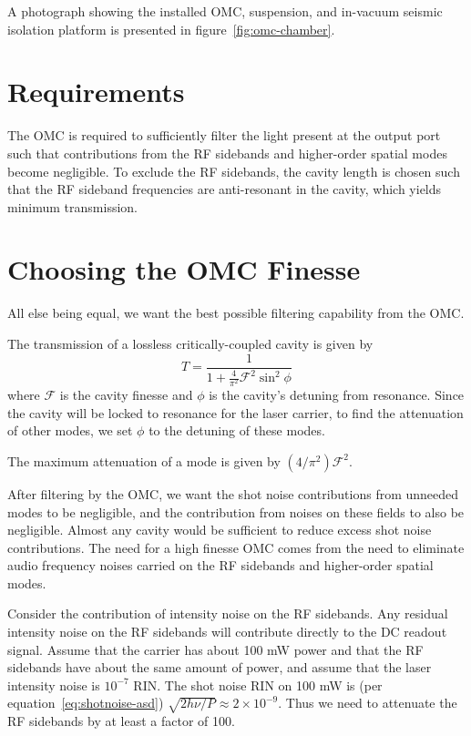 A photograph showing the installed OMC, suspension, and in-vacuum
seismic isolation platform is presented in
figure~\ref{fig:omc-chamber}.

\section{Requirements}

The OMC is required to sufficiently filter the light present at the
output port such that contributions from the RF sidebands and higher-order
spatial modes become negligible. To exclude the RF sidebands, the
cavity length is chosen such that the RF sideband frequencies are
anti-resonant in the cavity, which yields minimum transmission.

\section{Choosing the OMC Finesse}

All else being equal, we want the best possible filtering capability
from the OMC.

The transmission of a lossless critically-coupled cavity is given by
\begin{equation}
T = \frac{1}{1 + \frac{4}{\pi^2}\mathcal{F}^2\sin^2\phi}
\end{equation}
where $\mathcal{F}$ is the cavity finesse and $\phi$ is the cavity's
detuning from resonance.  Since the cavity will be locked to resonance
for the laser carrier, to find the attenuation of other modes, we set
$\phi$ to the detuning of these modes.

The maximum attenuation of a mode is given by $(4/\pi^2)\mathcal{F}^2$.

After filtering by the OMC, we want the shot noise contributions from
unneeded modes to be negligible, and the contribution from noises on
these fields to also be negligible.  Almost any cavity would be
sufficient to reduce excess shot noise contributions.  The need for a
high finesse OMC comes from the need to eliminate audio frequency
noises carried on the RF sidebands and higher-order spatial modes.

Consider the contribution of intensity noise on the RF sidebands.  Any
residual intensity noise on the RF sidebands will contribute directly
to the DC readout signal.  Assume that the carrier has about 100 mW
power and that the RF sidebands have about the same amount of power,
and assume that the laser intensity noise is $10^{-7}$ RIN.  The shot
noise RIN on 100 mW is (per equation~\ref{eq:shotnoise-asd})
$\sqrt{2h\nu/P} \approx 2\times10^{-9}$.  Thus we need to attenuate
the RF sidebands by at least a factor of 100.

